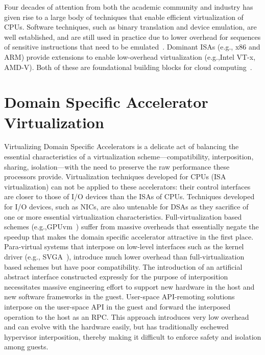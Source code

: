 Four decades of attention from both the academic community and industry has
given rise to a large body of techniques that enable efficient virtualization
of CPUs. Software techniques, such as binary translation and device emulation,
are well established, and are still used in practice due to lower overhead for
sequences of sensitive instructions that need to be emulated~\cite{
vmware-esx-bt-plus-vtx}. Dominant ISAs (e.g., x86 and ARM) provide extensions
to enable low-overhead virtualization (e.g.,Intel VT-x, AMD-V). Both of these
are foundational building blocks for cloud computing~\cite{amazon_ec2}.

\section{Domain Specific Accelerator Virtualization}
Virtualizing Domain Specific Accelerators is a delicate act of balancing the
essential characteristics of a virtualization scheme---compatibility,
interposition, sharing, isolation---with the need to preserve the raw
performance these processors provide.
Virtualization techniques developed for CPUs (ISA virtualization) can not be
applied to these accelerators: their control interfaces are closer to those of
I/O devices than the ISAs of CPUs. Techniques developed for I/O devices, such
as NICs, are also untenable for DSAs as they sacrifice of one or more
essential virtualization characteristics.
Full-virtualization based schemes (e.g.,GPUvm~\cite{suzuki2014gpuvm}) suffer
from massive overheads that essentially negate the speedup that makes the
domain specific accelerator attractive in the first place.
Para-virtual systems that interpose on low-level interfaces such as the kernel
driver (e.g., SVGA~\cite{dowty2009gpu}), introduce much lower overhead than
full-virtualization based schemes but have poor compatibility. The
introduction of an artificial abstract interface constructed expressly for the
purpose of interposition necessitates massive engineering effort to support
new hardware in the host and new software frameworks in the guest.
User-space API-remoting solutions~\cite{vmCUDA,rCUDA,rCUDAnew} interpose on
the user-space API in the guest and forward the interposed operation to the
host as an RPC. This approach introduces very low overhead and can evolve with
the hardware easily, but has traditionally eschewed hypervisor interposition,
thereby making it difficult to enforce safety and isolation among guests.

